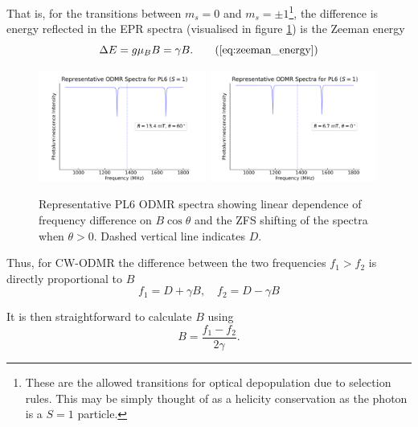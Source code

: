 {\color{edired}That is, for the transitions between $m_s=0$ and $m_s = \pm 1$\footnote{These are the allowed transitions for optical depopulation due to selection rules. This may be simply thought of as a helicity conservation as the photon is a $S=1$ particle.}, the difference is energy reflected in the EPR spectra (visualised in figure \ref{fig:linear_zeeman}) is the Zeeman energy
\begin{equation}
	\Delta E = g \mu_B B =  \gamma B.
	\tag{\ref{eq:zeeman_energy}}
\end{equation}
}
\begin{figure}[H]
    \begin{center}
        \includegraphics[width=0.49\textwidth]{figures/ODMR-s1magnet-2.png}
        \includegraphics[width=0.49\textwidth]{figures/ODMR-s1magnet-3.png}

    \end{center}
    \caption{Representative PL6 ODMR spectra showing linear dependence of frequency difference on $B\cos\theta$ and the ZFS shifting of the spectra when $\theta > 0$. Dashed vertical line indicates $D$.}\label{fig:linear_zeeman}
\end{figure}
Thus, for CW-ODMR the difference between the two frequencies $f_1 > f_2$ is directly proportional to $B$
\begin{equation}
	f_1 = D + \gamma B,  \quad f_2 = D - \gamma B
	\label{eq:}
\end{equation}

It is then straightforward to calculate $B$ using
\begin{equation}
	B = \frac{f_1 - f_2}{2 \gamma}.
	\label{eq:s1_parallel_magnetometry}
\end{equation}


